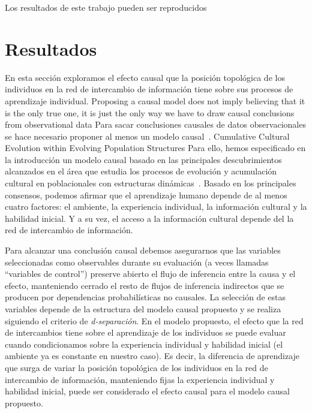 \documentclass[a4paper,11pt]{book}
\theoremstyle{definition}
\begin{document}
%
%
%
%

%
Los resultados de este trabajo pueden ser reproducidos


\section{Resultados}
En esta sección exploramos el efecto causal que la posición topológica de los individuos en la red de intercambio de información tiene sobre sus procesos de aprendizaje individual.
%
Proposing a causal model does not imply believing that it is the only true one, it is just the only way we have to draw causal conclusions from observational data
Para sacar conclusiones causales de datos observacionales se hace necesario proponer al menos un modelo causal~\cite{pearl2009-causality}.
%
Cumulative Cultural Evolution within Evolving Population Structures
Para ello, hemos especificado en la introducción un modelo causal basado en las principales descubrimientos alcanzados en el área que estudia los procesos de evolución y acumulación cultural en poblacionales con estructuras dinámicas~\cite{Derex2020}.
%
Basado en los principales consensos, podemos afirmar que el aprendizaje humano depende de al menos cuatro factores: el ambiente, la experiencia individual, la información cultural y la habilidad inicial.
%
Y a su vez, el acceso a la información cultural depende del la red de intercambio de información.

Para alcanzar una conclusión causal debemos asegurarnos que las variables seleccionadas como observables durante su evaluación (a veces llamadas ``variables de control'') preserve abierto el flujo de inferencia entre la causa y el efecto, manteniendo cerrado el resto de flujos de inferencia indirectos que se producen por dependencias probabilísticas no causales.
%
La selección de estas variables depende de la estructura del modelo causal propuesto y se realiza siguiendo el criterio de \emph{d-separación}.
%
En el modelo propuesto, el efecto que la red de intercambios tiene sobre el aprendizaje de los individuos se puede evaluar cuando condicionamos sobre la experiencia individual y habilidad inicial (el ambiente ya es constante en nuestro caso).
%
Es decir, la diferencia de aprendizaje que surga de variar la posición topológica de los individuos en la red de intercambio de información, manteniendo fijas la experiencia individual y habilidad inicial, puede ser considerado el efecto causal para el modelo causal propuesto.
%
\end{document}
